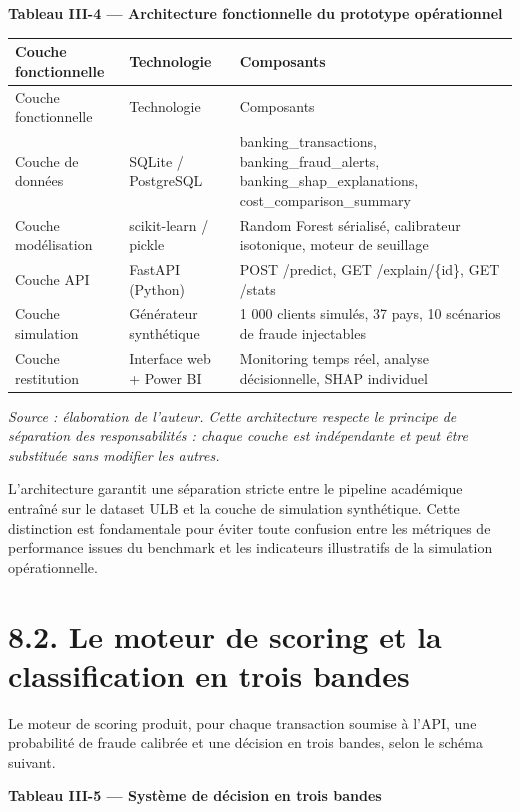 \textbf{Tableau III-4 — Architecture fonctionnelle du prototype opérationnel}

\begin{longtable}{|p{}|p{}|p{}|}
\hline
Couche fonctionnelle & Technologie & Composants \\
\hline
\endfirsthead
\hline
Couche fonctionnelle & Technologie & Composants \\
\hline
\endhead
Couche de données & SQLite / PostgreSQL & banking\_transactions, banking\_fraud\_alerts, banking\_shap\_explanations, cost\_comparison\_summary \\
\hline
Couche modélisation & scikit-learn / pickle & Random Forest sérialisé, calibrateur isotonique, moteur de seuillage \\
\hline
Couche API & FastAPI (Python) & POST /predict, GET /explain/\{id\}, GET /stats \\
\hline
Couche simulation & Générateur synthétique & 1 000 clients simulés, 37 pays, 10 scénarios de fraude injectables \\
\hline
Couche restitution & Interface web + Power BI & Monitoring temps réel, analyse décisionnelle, SHAP individuel \\
\hline
\end{longtable}

\emph{Source : élaboration de l'auteur. Cette architecture respecte le principe de séparation des responsabilités : chaque couche est indépendante et peut être substituée sans modifier les autres.}

L'architecture garantit une séparation stricte entre le pipeline académique entraîné sur le dataset ULB et la couche de simulation synthétique. Cette distinction est fondamentale pour éviter toute confusion entre les métriques de performance issues du benchmark et les indicateurs illustratifs de la simulation opérationnelle.

\section{8.2. Le moteur de scoring et la classification en trois bandes}

Le moteur de scoring produit, pour chaque transaction soumise à l'API, une probabilité de fraude calibrée et une décision en trois bandes, selon le schéma suivant.

\textbf{Tableau III-5 — Système de décision en trois bandes}

